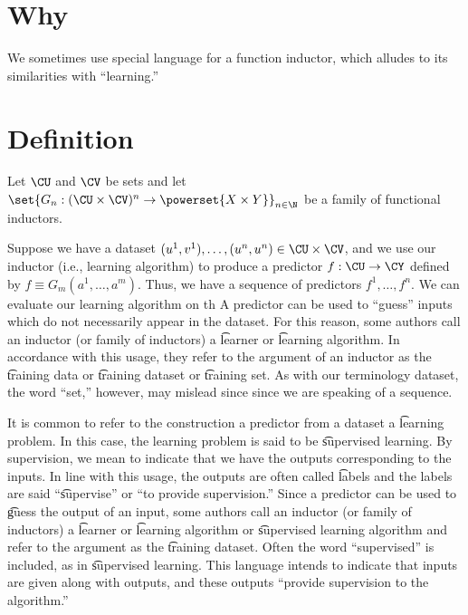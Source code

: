 
\section*{Why}

We sometimes use special language for a function inductor, which alludes to its similarities with ``learning.''

\section*{Definition}

Let $\CU$ and $\CV$ be sets and let $\set{G_n: (\CU \times \CV)^n \to \powerset{X \times  Y}}_{n \in \N  }$ be a family of functional inductors.

Suppose we have a dataset $(u^1, v^1), \dots , (u^n, u^n) \in \CU \times  \CV$, and we use our inductor (i.e., learning algorithm) to produce a predictor $f: \CU \to \CY$ defined by $f \equiv G_m(a^1, \dots , a^m)$.
Thus, we have a sequence of predictors $f^1, \dots , f^n$.
We can evaluate our learning algorithm on th
A predictor can be used to ``guess'' inputs which do not necessarily appear in the dataset.
For this reason, some authors call an inductor (or family of inductors) a \t{learner} or \t{learning algorithm}.
In accordance with this usage, they refer to the argument of an inductor as the \t{training data} or \t{training dataset} or \t{training set}.
As with our terminology dataset, the word ``set,'' however, may mislead since since we are speaking of a sequence.

It is common to refer to the construction a predictor from a dataset a \t{learning problem}.
In this case, the learning problem is said to be \t{supervised learning}.
By supervision, we mean to indicate that we have the outputs corresponding to the inputs.
In line with this usage, the outputs are often called \t{labels} and the labels are said ``\t{supervise}'' or ``to provide supervision.''
Since a predictor can be used to \t{guess} the output of an input, some authors call an inductor (or family of inductors) a \t{learner} or \t{learning algorithm} or \t{supervised learning algorithm} and refer to the argument as the \t{training dataset}.
Often the word ``supervised'' is included, as in \t{supervised learning}.
This language intends to indicate that inputs are given along with outputs, and these outputs ``provide supervision to the algorithm.''

\blankpage

